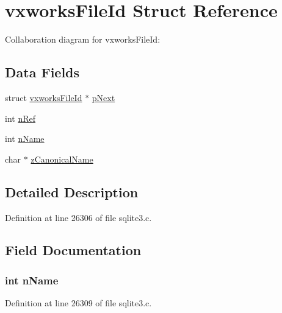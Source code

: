 \hypertarget{structvxworks_file_id}{}\section{vxworks\+File\+Id Struct Reference}
\label{structvxworks_file_id}


Collaboration diagram for vxworks\+File\+Id\+:
\subsection*{Data Fields}
\begin{DoxyCompactItemize}
\item 
struct \hyperlink{structvxworks_file_id}{vxworks\+File\+Id} $\ast$ \hyperlink{structvxworks_file_id_aa7116bf768457ee02c7488fc6c98baa5}{p\+Next}
\item 
int \hyperlink{structvxworks_file_id_a3c459f9ae278c22b72583c55ca01acb7}{n\+Ref}
\item 
int \hyperlink{structvxworks_file_id_acc91562d27ea1c31ec0b874cc62e9cf3}{n\+Name}
\item 
char $\ast$ \hyperlink{structvxworks_file_id_a924e630d35893bcc88da1c2e913bddf9}{z\+Canonical\+Name}
\end{DoxyCompactItemize}


\subsection{Detailed Description}


Definition at line 26306 of file sqlite3.\+c.



\subsection{Field Documentation}
\hypertarget{structvxworks_file_id_acc91562d27ea1c31ec0b874cc62e9cf3}{}
\subsubsection[{n\+Name}]{\setlength{\rightskip}{0pt plus 5cm}int n\+Name}\label{structvxworks_file_id_acc91562d27ea1c31ec0b874cc62e9cf3}


Definition at line 26309 of file sqlite3.\+c.

\hypertarget{structvxworks_file_id_a3c459f9ae278c22b72583c55ca01acb7}{}
